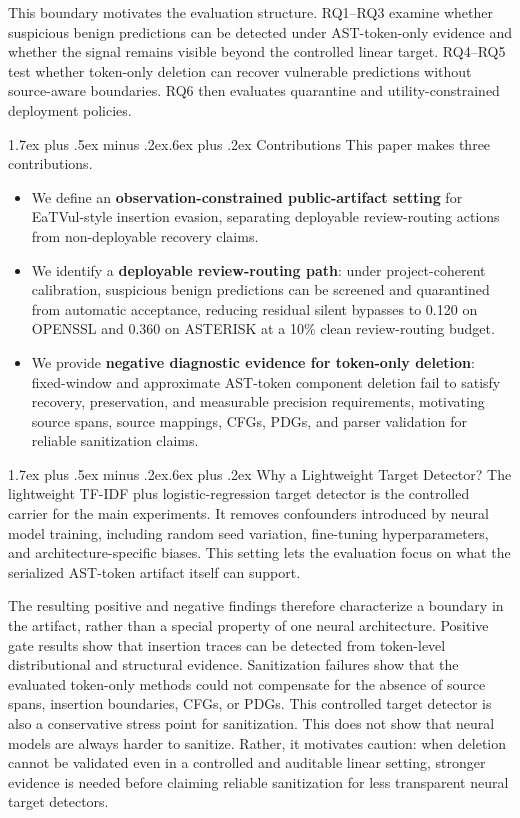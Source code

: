 \documentclass[letterpaper,twocolumn,10pt,twoside]{article}
\makeatletter
\renewcommand\subsection{\@startsection{subsection}{2}{\z@}%
  {1.7ex plus .5ex minus .2ex}{.6ex plus .2ex}%
  {\normalfont\normalsize\bfseries}}
\newcommand{\dataset}[1]{\textsc{#1}}
\makeatother
\begin{document}
This boundary motivates the evaluation structure. RQ1--RQ3 examine whether suspicious benign predictions can be detected under AST-token-only evidence and whether the signal remains visible beyond the controlled linear target. RQ4--RQ5 test whether token-only deletion can recover vulnerable predictions without source-aware boundaries. RQ6 then evaluates quarantine and utility-constrained deployment policies.

\subsection{Contributions}
This paper makes three contributions.
\begin{itemize}
  \item We define an \textbf{observation-constrained public-artifact setting} for EaTVul-style insertion evasion, separating deployable review-routing actions from non-deployable recovery claims.
  \item We identify a \textbf{deployable review-routing path}: under project-coherent calibration, suspicious benign predictions can be screened and quarantined from automatic acceptance, reducing residual silent bypasses to 0.120 on \dataset{OPENSSL} and 0.360 on \dataset{ASTERISK} at a 10\% clean review-routing budget.
  \item We provide \textbf{negative diagnostic evidence for token-only deletion}: fixed-window and approximate AST-token component deletion fail to satisfy recovery, preservation, and measurable precision requirements, motivating source spans, source mappings, CFGs, PDGs, and parser validation for reliable sanitization claims.
\end{itemize}

\subsection{Why a Lightweight Target Detector?}
The lightweight TF-IDF plus logistic-regression target detector is the controlled carrier for the main experiments. It removes confounders introduced by neural model training, including random seed variation, fine-tuning hyperparameters, and architecture-specific biases. This setting lets the evaluation focus on what the serialized AST-token artifact itself can support.

The resulting positive and negative findings therefore characterize a boundary in the artifact, rather than a special property of one neural architecture. Positive gate results show that insertion traces can be detected from token-level distributional and structural evidence. Sanitization failures show that the evaluated token-only methods could not compensate for the absence of source spans, insertion boundaries, CFGs, or PDGs. This controlled target detector is also a conservative stress point for sanitization. This does not show that neural models are always harder to sanitize. Rather, it motivates caution: when deletion cannot be validated even in a controlled and auditable linear setting, stronger evidence is needed before claiming reliable sanitization for less transparent neural target detectors.
\end{document}
